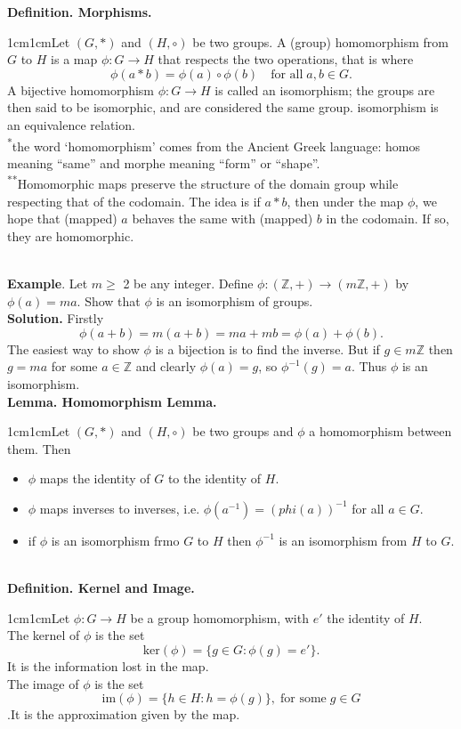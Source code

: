 \documentclass{article}
\newcommand{\definition}[2]{\textbf{Definition. #1.}\begin{adjustwidth}{1cm}{1cm}#2\end{adjustwidth}}
\newcommand{\lemma}[2]{\textbf{Lemma. #1.}\begin{adjustwidth}{1cm}{1cm}#2\end{adjustwidth}}
\begin{document}
\definition{Morphisms}{Let $(G, *)$ and $(H, \circ)$ be two groups. A (group) homomorphism from $G$ to $H$ is a map $\phi : G \rightarrow H$ that respects the two operations, that is where \[\phi(a * b) = \phi(a) \circ \phi(b) \quad \text{for all} \; a,b \in G.\]A bijective homomorphism $\phi: G \rightarrow H$ is called an isomorphism; the groups are then said to be isomorphic, and are considered the same group. isomorphism is an equivalence relation.\\[1\baselineskip]\textsuperscript{*}the word `homomorphism' comes from the Ancient Greek language: homos meaning ``same'' and morphe meaning ``form'' or ``shape''.\\[1\baselineskip]\textsuperscript{**}Homomorphic maps preserve the structure of the domain group while respecting that of the codomain. The idea is if $a * b$, then under the map $\phi$, we hope that (mapped) $a$ behaves the same with (mapped) $b$ in the codomain. If so, they are homomorphic.}~\\
\textbf{Example}. Let $m \geq$ 2 be any integer. Define $\phi: (\mathbb{Z},+) \rightarrow (m\mathbb{Z},+)$ by $\phi(a) = ma$. Show that $\phi$ is an isomorphism of groups.\\
\textbf{Solution.} Firstly \[\phi(a+b)=m(a+b)=ma+mb=\phi(a)+\phi(b).\]The easiest way to show $\phi$ is a bijection is to find the inverse. But if $g \in m\mathbb{Z}$ then $g=ma$ for some $a \in \mathbb{Z}$ and clearly $\phi(a) = g$, so $\phi^{-1}(g) = a$. Thus $\phi$ is an isomorphism.\\[1\baselineskip]
\lemma{Homomorphism Lemma}{Let $(G, *)$ and $(H, \circ)$ be two groups and $\phi$ a homomorphism between them. Then \begin{itemize}\item $\phi$ maps the identity of $G$ to the identity of $H$.\item $\phi$ maps inverses to inverses, i.e. $\phi(a^{-1})=(phi(a))^{-1}$ for all $a \in G$.\item if $\phi$ is an isomorphism frmo $G$ to $H$ then $\phi^{-1}$ is an isomorphism from $H$ to $G$.\end{itemize}}~\\
\definition{Kernel and Image}{Let $\phi : G \rightarrow H$ be a group homomorphism, with $e'$ the identity of $H$.\\The kernel of $\phi$ is the set \[\text{ker}(\phi) = \{g \in G: \phi(g) = e' \}.\]It is the information lost in the map.\\The image of $\phi$ is the set \[\text{im}(\phi) = \{h \in H : h = \phi(g)\}, \; \text{for some} \; g \in G\].It is the approximation given by the map.}~\\
\end{document}
